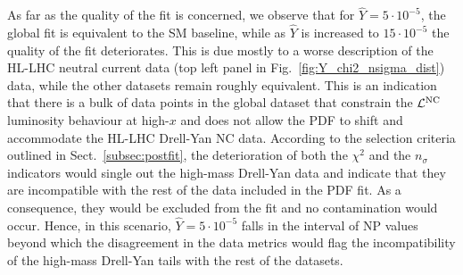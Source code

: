 \documentclass[withindex,glossary]{cam-thesis}
\begin{document}
As far as the quality of the fit is concerned, we observe that for
$\hat{Y}=5\cdot 10^{-5}$, the global fit is
    equivalent to the SM baseline, while as $\hat{Y}$ is increased to
    $15\cdot 10^{-5}$ the quality of the fit deteriorates. This is due
    mostly to a worse description of the HL-LHC neutral current data (top left panel in Fig.~\ref{fig:Y_chi2_nsigma_dist}) data, while the other datasets remain
    roughly equivalent. This is an indication that there is a bulk of data points 
    in the global dataset that constrain the ${\cal L}^{\rm NC}$ luminosity behaviour at high-$x$ and 
    does not allow the PDF to shift and accommodate the HL-LHC Drell-Yan NC data.
    According to the selection criteria outlined in
    Sect.~\ref{subsec:postfit}, the deterioration of both the $\chi^2$ and the $n_{\sigma}$ indicators
    would single out the high-mass Drell-Yan data and indicate that they
    are incompatible with the rest of the data included in the PDF fit.
    As a consequence, they would be excluded from the fit and no contamination would occur. 
    Hence, in this scenario, $\hat{Y}=5\cdot10^{-5}$ falls in the interval of NP values beyond which the disagreement in
    the data metrics would flag the incompatibility of the high-mass Drell-Yan
    tails with the rest of the datasets. 
\end{document}
